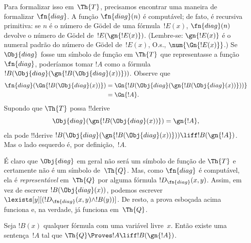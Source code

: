 \documentclass[../../../include/open-logic-section]{subfiles}
\begin{document}
\begin{explain}
Para formalizar isso em~$\Th{T}$, precisamos encontrar uma maneira de
formalizar $\fn{diag}$. A função $\fn{diag}(n)$ é computável; de fato, é
recursiva primitiva: se $n$ é o número de G\"odel de uma fórmula~$!E(x)$,
$\fn{diag}(n)$ devolve o número de G\"odel de~$!E(\gn{!E(x)})$. (Lembre-se:
$\gn{!E(x)}$ é o numeral padrão do número de G\"odel de~$!E(x)$, O.s.\@,
$\num{\Gn{!E(x)}}$.) Se $\Obj{diag}$ fosse um símbolo de função em
$\Th{T}$ que representasse a função $\fn{diag}$, poderíamos tomar $!A$
como a fórmula $!B(\Obj{diag}(\gn{!B(\Obj{diag}(x))}))$. Observe que
\begin{align*}
\fn{diag}(\Gn{!B(\Obj{diag}(x))}) & = 
\Gn{!B(\Obj{diag}(\gn{!B(\Obj{diag}(x))}))} \\
& = \Gn{!A}.
\end{align*}
Supondo que $\Th{T}$ possa !!{derive}
\[
\Obj{diag}(\gn{!B(\Obj{diag}(x))}) = \gn{!A},
\]
ela pode !!{derive} $!B(\Obj{diag}(\gn{!B(\Obj{diag}(x))}))
\liff !B(\gn{!A})$. Mas o lado esquerdo é, por definição,~$!A$.

É claro que $\Obj{diag}$ em geral não será um símbolo de função de
$\Th{T}$ e certamente não é um símbolo de~$\Th{Q}$. Mas, como
$\fn{diag}$ é computável, ela é \emph{representável} em~$\Th{Q}$ por alguma
fórmula $!D_{\fn{diag}}(x,y)$. Assim, em vez de escrever
$!B(\Obj{diag}(x))$, podemos escrever
$\lexists[y][(!D_{\fn{diag}}(x,y) \land !B(y))]$. De resto, a prova
esboçada acima funciona e, na verdade, já funciona em~$\Th{Q}$.
\end{explain}

\begin{lem}
 Seja $!B(x)$ qualquer fórmula com uma variável
livre~$x$. Então existe uma sentença~$!A$ tal que $\Th{Q} \Proves
!A \liff !B(\gn{!A})$.
\end{lem}
\end{document}
